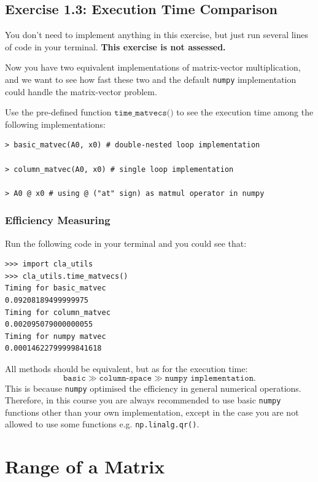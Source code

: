 \subsection*{Exercise 1.3: Execution Time Comparison}%
You don't need to implement anything in this exercise, but just run several lines of code in your terminal. \textbf{This exercise is not assessed.}
\begin{problem}
Now you have two equivalent implementations of matrix-vector multiplication, and we want to see how fast these two and the default \texttt{numpy} implementation could handle the matrix-vector problem. 

\noindent Use the pre-defined function $\texttt{time\_matvecs()}$ to see the execution time among the following implementations:
\begin{lstlisting}
> basic_matvec(A0, x0) # double-nested loop implementation

> column_matvec(A0, x0) # single loop implementation

> A0 @ x0 # using @ ("at" sign) as matmul operator in numpy
\end{lstlisting}
\end{problem}
\subsubsection*{Efficiency Measuring}
Run the following code in your terminal and you could see that:
\begin{lstlisting}
>>> import cla_utils
>>> cla_utils.time_matvecs()
Timing for basic_matvec
0.09208189499999975
Timing for column_matvec
0.002095079000000055
Timing for numpy matvec
0.00014622799999841618
\end{lstlisting}
All methods should be equivalent, but as for the execution time:
\[
\texttt{basic} \gg \texttt{column-space} \gg \texttt{numpy implementation}
.\]
This is because \texttt{numpy} optimised the efficiency in general numerical operations. Therefore, in this course you are always recommended to use basic \texttt{numpy} functions other than your own implementation, except in the case you are not allowed to use some functions e.g. \texttt{np.linalg.qr()}. \checked
\section{Range of a Matrix}%
\label{sec1.4}
